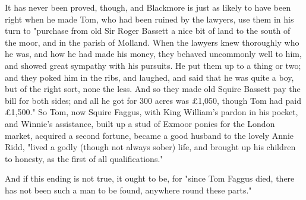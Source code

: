 It has never been proved, though, and Blackmore is just as likely to have been right when he made Tom, who had been ruined by the lawyers, use them in his turn to "purchase from old Sir Roger Bassett a nice bit of land to the south of the moor, and in the parish of Molland. When the lawyers knew thoroughly who he was, and how he had made his money, they behaved uncommonly well to him, and showed great sympathy with his pursuits. He put them up to a thing or two; and they poked him in the ribs, and laughed, and said that he was quite a boy, but of the right sort, none the less. And so they made old Squire Bassett pay the bill for both sides; and all he got for 300 acres was £1,050, though Tom had paid £1,500." So Tom, now Squire Faggus, with King William's pardon in his pocket, and Winnie's assistance, built up a stud of Exmoor ponies for the London market, acquired a second fortune, became a good husband to the lovely Annie Ridd, "lived a godly (though not always sober) life, and brought up his children to honesty, as the first of all qualifications."

And if this ending is not true, it ought to be, for "since Tom Faggus died, there has not been such a man to be found, anywhere round these parts."